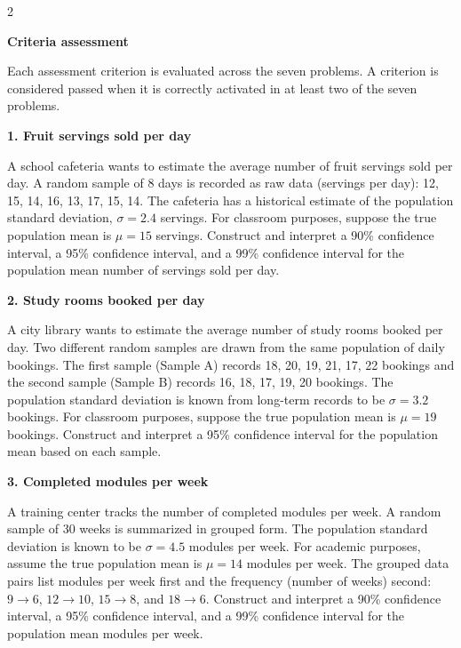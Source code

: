 \documentclass[12pt]{article}
\newcommand{\SubsectionBox}[1]{%
	\noindent\colorbox{gray!30}{%
		\parbox{\linewidth}{\textbf{#1}}%
	}\par\vspace{0.35cm}%
}
\begin{document}
	\begin{multicols}{2}
		\SubsectionBox{Criteria assessment}\vspace{-0.25cm}
		Each assessment criterion is evaluated across the seven problems. A criterion is considered passed when it is correctly activated in at least two of the seven problems.

		\vspace{0.25cm}
		\SubsectionBox{1. Fruit servings sold per day}\vspace{-0.25cm}
		A school cafeteria wants to estimate the average number of fruit servings sold per day.
		A random sample of 8 days is recorded as raw data (servings per day): 12, 15, 14, 16, 13, 17, 15, 14.
		The cafeteria has a historical estimate of the population standard deviation, \(\sigma = 2.4\) servings.
		For classroom purposes, suppose the true population mean is \(\mu = 15\) servings.
		Construct and interpret a 90\% confidence interval, a 95\% confidence interval, and a 99\% confidence interval for the population mean number of servings sold per day.

		\vspace{0.25cm}
		\SubsectionBox{2. Study rooms booked per day}\vspace{-0.25cm}
		A city library wants to estimate the average number of study rooms booked per day.
		Two different random samples are drawn from the same population of daily bookings.
		The first sample (Sample A) records 18, 20, 19, 21, 17, 22 bookings and the second sample (Sample B) records 16, 18, 17, 19, 20 bookings.
		The population standard deviation is known from long-term records to be \(\sigma = 3.2\) bookings.
		For classroom purposes, suppose the true population mean is \(\mu = 19\) bookings.
		Construct and interpret a 95\% confidence interval for the population mean based on each sample.

		\vspace{0.25cm}
		\SubsectionBox{3. Completed modules per week}\vspace{-0.25cm}
		A training center tracks the number of completed modules per week.
		A random sample of 30 weeks is summarized in grouped form. The population standard deviation is known to be \(\sigma = 4.5\) modules per week.
		For academic purposes, assume the true population mean is \(\mu = 14\) modules per week.
		The grouped data pairs list modules per week first and the frequency (number of weeks) second: \(9 \rightarrow 6\), \(12 \rightarrow 10\), \(15 \rightarrow 8\), and \(18 \rightarrow 6\).
		Construct and interpret a 90\% confidence interval, a 95\% confidence interval, and a 99\% confidence interval for the population mean modules per week.


\end{multicols}
\end{document}
